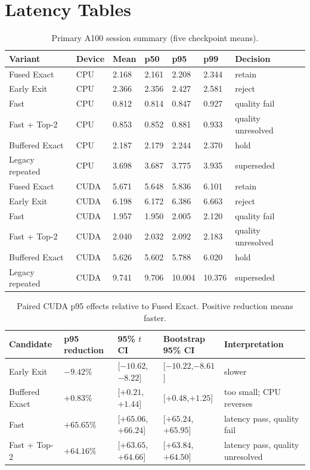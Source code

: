 \documentclass{ieeeaccess}
\begin{document}
\section{Latency Tables}

\begin{table}[t]
\caption{Primary A100 session summary (five checkpoint means).}\label{tab:a100}\small
\begin{tabularx}{\textwidth}{llYYYYY}
\toprule Variant & Device & Mean & p50 & p95 & p99 & Decision \\
\midrule
Fused Exact & CPU & 2.168 & 2.161 & 2.208 & 2.344 & retain \\
Early Exit & CPU & 2.366 & 2.356 & 2.427 & 2.581 & reject \\
Fast & CPU & 0.812 & 0.814 & 0.847 & 0.927 & quality fail \\
Fast + Top-2 & CPU & 0.853 & 0.852 & 0.881 & 0.933 & quality unresolved \\
Buffered Exact & CPU & 2.187 & 2.179 & 2.244 & 2.370 & hold \\
Legacy repeated & CPU & 3.698 & 3.687 & 3.775 & 3.935 & superseded \\
Fused Exact & CUDA & 5.671 & 5.648 & 5.836 & 6.101 & retain \\
Early Exit & CUDA & 6.198 & 6.172 & 6.386 & 6.663 & reject \\
Fast & CUDA & 1.957 & 1.950 & 2.005 & 2.120 & quality fail \\
Fast + Top-2 & CUDA & 2.040 & 2.032 & 2.092 & 2.183 & quality unresolved \\
Buffered Exact & CUDA & 5.626 & 5.602 & 5.788 & 6.020 & hold \\
Legacy repeated & CUDA & 9.741 & 9.706 & 10.004 & 10.376 & superseded \\
\bottomrule
\end{tabularx}
\end{table}

\begin{table}[t]
\caption{Paired CUDA p95 effects relative to Fused Exact. Positive reduction means faster.}\label{tab:paired}\small
\begin{tabularx}{\textwidth}{lYYYY}
\toprule Candidate & p95 reduction & 95\% $t$ CI & Bootstrap 95\% CI & Interpretation \\
\midrule
Early Exit & $-9.42\%$ & [$-10.62$,$-8.22$] & [$-10.22$,$-8.61$] & slower \\
Buffered Exact & $+0.83\%$ & [$+0.21$,$+1.44$] & [$+0.48$,$+1.25$] & too small; CPU reverses \\
Fast & $+65.65\%$ & [$+65.06$,$+66.24$] & [$+65.24$,$+65.95$] & latency pass, quality fail \\
Fast + Top-2 & $+64.16\%$ & [$+63.65$,$+64.66$] & [$+63.84$,$+64.50$] & latency pass, quality unresolved \\
\bottomrule
\end{tabularx}
\end{table}
\end{document}
